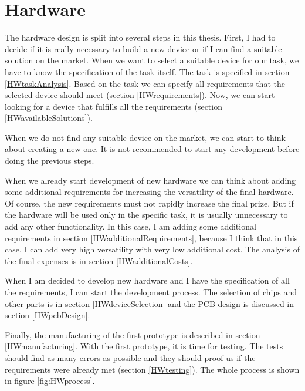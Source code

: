 \chapter{Hardware}
The hardware design is split into several steps in this thesis. First, I had to decide if it is really necessary to build a new device or if I can find a suitable solution on the market. When we want to select a suitable device for our task, we have to know the specification of the task itself. The task is specified in section \ref{HWtaskAnalysis}. Based on the task we can specify all requirements that the selected device should meet (section \ref{HWrequirements}). Now, we can start looking for a device that fulfills all the requirements (section \ref{HWavailableSolutions}).

When we do not find any suitable device on the market, we can start to think about creating a new one. It is not recommended to start any development before doing the previous steps.

When we already start development of new hardware we can think about adding some additional requirements for increasing the versatility of the final hardware. Of course, the new requirements must not rapidly increase the final prize. But if the hardware will be used only in the specific task, it is usually unnecessary to add any other functionality. In this case, I am adding some additional requirements in section \ref{HWadditionalRequirements}, because I think that in this case, I can add very high versatility with very low additional cost. The analysis of the final expenses is in section \ref{HWadditionalCosts}.

When I am decided to develop new hardware and I have the specification of all the requirements, I can start the development process. The selection of chips and other parts is in section \ref{HWdeviceSelection} and the \ac{PCB} design is discussed in section \ref{HWpcbDesign}.

Finally, the manufacturing of the first prototype is described in section \ref{HWmanufacturing}. With the first prototype, it is time for testing. The tests should find as many errors as possible and they should proof us if the requirements were already met (section \ref{HWtesting}). The whole process is shown in figure \ref{fig:HWprocess}.

